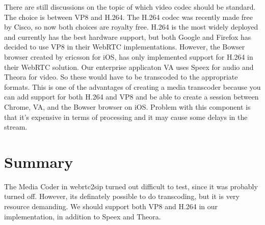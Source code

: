 There are still discussions on the topic of which video codec should be standard. The choice is between VP8 and H.264. The H.264 codec was recently made free by Cisco, so now both choices are royalty free. H.264 is the most widely deployed and currently has the best hardware support, but both Google and Firefox has decided to use VP8 in their WebRTC implementations. However, the Bowser browser created by ericsson for iOS, has only implemented support for H.264 in their WebRTC solution. Our enterprise applicaton VA uses Speex for audio and Theora for video. So these would have to be transcoded to the appropriate formats. This is one of the advantages of creating a media transcoder because you can add support for both H.264 and VP8 and be able to create a session between Chrome, VA, and the Bowser browser on iOS. Problem with this component is that it's expensive in terms of processing and it may cause some delays in the stream.

\section{Summary}
The Media Coder in webrtc2sip turned out difficult to test, since it was probably turned off. However, its definately possible to do transcoding, but it is very resource demanding. We should support both VP8 and H.264 in our implementation, in addition to Speex and Theora.